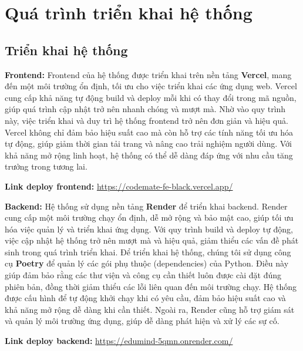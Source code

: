 \section{Quá trình triển khai hệ thống}
\subsection*{Triển khai hệ thống}
\textbf{Frontend:}
Frontend của hệ thống được triển khai trên nền tảng \textbf{Vercel}, mang đến một môi trường ổn định, tối ưu cho việc triển khai các ứng dụng web. Vercel cung cấp khả năng tự động build và deploy mỗi khi có thay đổi trong mã nguồn, giúp quá trình cập nhật trở nên nhanh chóng và mượt mà. Nhờ vào quy trình này, việc triển khai và duy trì hệ thống frontend trở nên đơn giản và hiệu quả.
Vercel không chỉ đảm bảo hiệu suất cao mà còn hỗ trợ các tính năng tối ưu hóa tự động, giúp giảm thời gian tải trang và nâng cao trải nghiệm người dùng. Với khả năng mở rộng linh hoạt, hệ thống có thể dễ dàng đáp ứng với nhu cầu tăng trưởng trong tương lai.
\par \textbf{Link deploy frontend:} \textcolor{blue}{\href{https://codemate-fe-black.vercel.app/}{https://codemate-fe-black.vercel.app/}}

\textbf{Backend:}
Hệ thống sử dụng nền tảng \textbf{Render} để triển khai backend. Render cung cấp một môi trường chạy ổn định, dễ mở rộng và bảo mật cao, giúp tối ưu hóa việc quản lý và triển khai ứng dụng. Với quy trình build và deploy tự động, việc cập nhật hệ thống trở nên mượt mà và hiệu quả, giảm thiểu các vấn đề phát sinh trong quá trình triển khai.
Để triển khai hệ thống, chúng tôi sử dụng công cụ \textbf{Poetry} để quản lý các gói phụ thuộc (dependencies) của Python. Điều này giúp đảm bảo rằng các thư viện và công cụ cần thiết luôn được cài đặt đúng phiên bản, đồng thời giảm thiểu các lỗi liên quan đến môi trường chạy.
Hệ thống được cấu hình để tự động khởi chạy khi có yêu cầu, đảm bảo hiệu suất cao và khả năng mở rộng dễ dàng khi cần thiết. Ngoài ra, Render cũng hỗ trợ giám sát và quản lý môi trường ứng dụng, giúp dễ dàng phát hiện và xử lý các sự cố.
\par \textbf{Link deploy backend:} \textcolor{blue}{\href{https://edumind-5qmn.onrender.com/}{https://edumind-5qmn.onrender.com/}}

